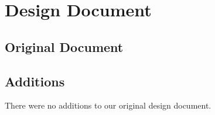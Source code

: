 \section{Design Document}
\subsection{Original Document}

\subsection{Additions}
There were no additions to our original design document.